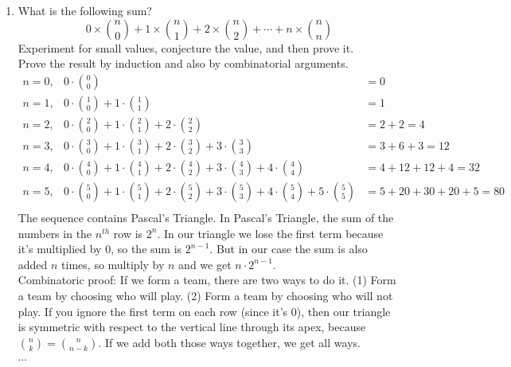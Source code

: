 \documentclass[10pt,a4paper,final]{article}
\begin{document}
\begin{enumerate}
\item %
What is the following sum?
\begin{equation*}
0 \times {n \choose 0} + 1 \times \binom{n}{1} + 2 \times \binom{n}{2} + \cdots + n \times \binom{n}{n}
\end{equation*}
Experiment for small values, conjecture the value, and then prove it.\\
Prove the result by induction and also by combinatorial arguments.
\begin{eqnarray*}
n = 0, & 0 \cdot \binom{0}{0} &= 0\\
n = 1, & 0 \cdot \binom{1}{0} + 1 \cdot \binom{1}{1} &= 1\\
n = 2, & 0 \cdot \binom{2}{0} + 1 \cdot \binom{2}{1} + 2 \cdot \binom{2}{2} &= 2 + 2 = 4\\
n = 3, & 0 \cdot \binom{3}{0} + 1 \cdot \binom{3}{1} + 2 \cdot \binom{3}{2} + 3 \cdot \binom{3}{3}
&= 3 + 6 + 3 = 12\\
n = 4, & 0 \cdot \binom{4}{0} + 1 \cdot \binom{4}{1} + 2 \cdot \binom{4}{2} + 3 \cdot \binom{4}{3}
+ 4 \cdot \binom{4}{4} &= 4 + 12 + 12 + 4 = 32\\
n = 5, & 0 \cdot \binom{5}{0} + 1 \cdot \binom{5}{1} + 2 \cdot \binom{5}{2} + 3 \cdot \binom{5}{3}
+ 4 \cdot \binom{5}{4} + 5 \cdot \binom {5}{5} &= 5 + 20 + 30 + 20 + 5 = 80\\
\end{eqnarray*}
The sequence contains Pascal's Triangle.
In Pascal's Triangle, the sum of the numbers in the $n^{th}$ row is $2^n$.
In our triangle we lose the first term because it's multiplied by 0, so the sum is $2^{n-1}$.
But in our case the sum is also added $n$ times, so multiply by $n$ and we get $n \cdot 2^{n-1}$.
\\
Combinatoric proof: If we form a team, there are two ways to do it.
(1) Form a team by choosing who will play. (2) Form a team by choosing who will not play.
If you ignore the first term on each row (since it's 0), then our triangle is symmetric with
respect to the vertical line through its apex, because $\binom{n}{k} = \binom{n}{n-k}$.
If we add both those ways together, we get all ways.\\
$\cdots$
\end{enumerate}
\end{document}
